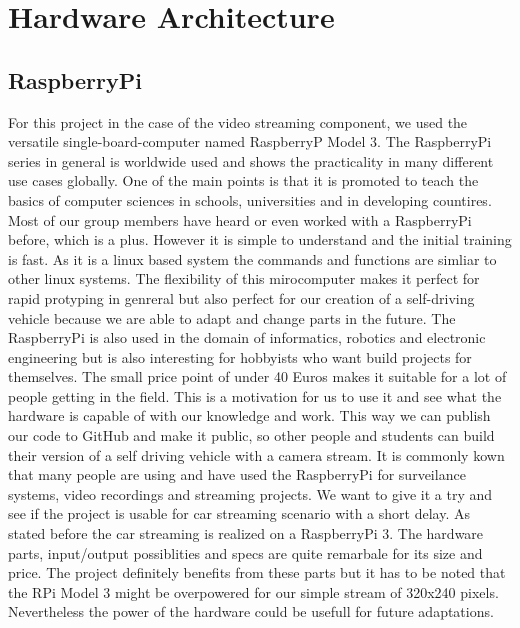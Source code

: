 \documentclass[conference]{IEEEtran}
\begin{document}
\section{Hardware Architecture}
\subsection{RaspberryPi}
For this project in the case of the video streaming component, we used the versatile single-board-computer named RaspberryP Model 3. The RaspberryPi series in general is worldwide used and shows the practicality in many different use cases globally. One of the main points is that it is promoted to teach the basics of computer sciences in schools, universities and in developing countires. Most of our group members have heard or even worked with a RaspberryPi before, which is a plus. However it is simple to understand and the initial training is fast. As it is a linux based system the commands and functions are simliar to other linux systems. The flexibility of this mirocomputer makes it perfect for rapid protyping in genreral but also perfect for our creation of a self-driving vehicle because we are able to adapt and change parts in the future. The RaspberryPi is also used in the domain of informatics, robotics and electronic engineering but is also interesting for hobbyists who want build projects for themselves. The small price point of under 40 Euros makes it suitable for a lot of people getting in the field. This is a motivation for us to use it and see what the hardware is capable of with our knowledge and work. This way we can publish our code to GitHub and make it public, so other people and students can build their version of a self driving vehicle with a camera stream. It is commonly kown that many people are using and have used the RaspberryPi for surveilance systems, video recordings and streaming projects. We want to give it a try and see if the project is usable for car streaming scenario with a short delay.
\newline
As stated before the car streaming is realized on a RaspberryPi 3. The hardware parts, input/output possiblities and specs are quite remarbale for its size and price. The project definitely benefits from these parts but it has to be noted that the RPi Model 3 might be overpowered for our simple stream of 320x240 pixels. Nevertheless the power of the hardware could be usefull for future adaptations. 
\end{document}
